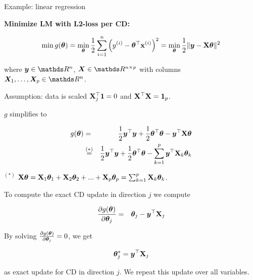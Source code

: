 \documentclass[11pt,compress,t,notes=noshow, xcolor=table]{beamer}
\begin{document}
\begin{vbframe}{Example: linear regression}

\textbf{Minimize LM with L2-loss per CD:}
\vspace*{0.2cm}

$$
    \min g(\bm{\theta}) = \min_{\bm{\theta}} \frac{1}{2}\sum\limits_{i=1}^n \left(y^{(i)} - \bm{\theta}^\top \mathbf{x}^{(i)}\right)^2 = \min_{\bm{\theta}} \frac{1}{2}\|\bm{y} - \mathbf{X} \bm{\theta}\|^2 
$$

where $\bm{y} \in \R^n$, $\bm{X} \in \R^{n \times p}$ with columns $\bm{X}_1, \hdots, \bm{X}_p \in \R^n$. 

\vspace*{0.3cm}

Assumption: data is scaled $\mathbf{X}_j^\top \mathbf{1} = 0$ and $\mathbf{X}^\top \mathbf{X} = \bm{1}_p$. 

\lz 

$g$ simplifies to 

\begin{footnotesize}
\begin{eqnarray*}
    g(\bm{\theta}) &=& \frac{1}{2}\bm{y}^\top \bm{y} + \frac{1}{2}\bm{\theta}^\top \bm{\theta} - \bm{y}^\top \mathbf{X} \bm{\theta}  \\
    &\overset{(*)}{=}& \frac{1}{2}\bm{y}^\top \bm{y} + \frac{1}{2}\bm{\theta}^\top \bm{\theta}  - \sum_{k = 1}^p \bm{y}^\top \mathbf{X}_k \bm{\theta}_k 
\end{eqnarray*}

\vfill
$^{(*)}$ $\mathbf{X} \bm{\theta} = \mathbf{X}_1 \bm{\theta}_1 + \mathbf{X}_2 \bm{\theta}_2 + ... + \mathbf{X}_p \bm{\theta}_p = \sum_{k = 1}^p \mathbf{X}_k \bm{\theta}_k$.
\end{footnotesize}

\framebreak

To compute the exact CD update in direction $j$ we compute 

\begin{eqnarray*}
    \frac{\partial{g}(\bm{\theta})}{\partial \bm{\theta}_j} &=& \bm{\theta}_j - \bm{y}^\top \mathbf{X}_j 
\end{eqnarray*}  

By solving $\frac{\partial{g}(\bm{\theta})}{\partial \bm{\theta}_j} = 0$, we get 

$$
    \bm{\theta}_j^\ast = \bm{y}^\top \mathbf{X}_j
$$ 

as exact update for CD in direction $j$.  We repeat this update over all variables. 



\end{vbframe}
\end{document}
